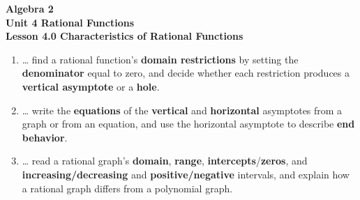 \documentclass[10pt]{article}
\begin{document}
\vspace{-0.8in}

\begin{center}
  {\color{white}\textbf{\LARGE Algebra 2}}\\[4pt]
  {\color{forestmid}\large\textbf{Unit 4 \quad Rational Functions}}\\[6pt]
  {\color{white}\textbf{\large Lesson 4.0 \quad Characteristics of Rational Functions}}
\end{center}

\vspace{0.22in}
\namedateperiod
\vspace{0.18in}

\begin{learningtargetbox}
\small
\begin{enumerate}[leftmargin=1.5em, itemsep=5pt]
  \item \ldots{} find a rational function's \textbf{domain restrictions} by setting the \textbf{denominator} equal to zero, and decide whether each restriction produces a \textbf{vertical asymptote} or a \textbf{hole}.
  \item \ldots{} write the \textbf{equations} of the \textbf{vertical} and \textbf{horizontal} asymptotes from a graph or from an equation, and use the horizontal asymptote to describe \textbf{end behavior}.
  \item \ldots{} read a rational graph's \textbf{domain}, \textbf{range}, \textbf{intercepts}/\textbf{zeros}, and \textbf{increasing/decreasing} and \textbf{positive/negative} intervals, and explain how a rational graph differs from a polynomial graph.
\end{enumerate}
\end{learningtargetbox}

\vspace{0.14in}
\end{document}
